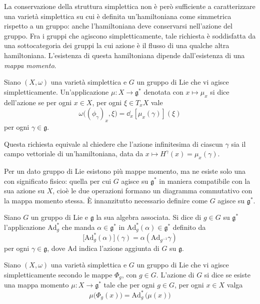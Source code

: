 La conservazione della struttura simplettica non è però sufficiente a caratterizzare una varietà simplettica su cui è definita un'hamiltoniana come simmetrica rispetto a un gruppo: anche l'hamiltoniana deve conservarsi nell'azione del gruppo. Fra i gruppi che agiscono simpletticamente, tale richiesta è soddisfatta da una sottocategoria dei gruppi la cui azione è il flusso di una qualche altra hamiltoniana. L'esistenza di questa hamiltoniana dipende dall'esistenza di una \emph{mappa momento}.
\begin{definition}
  Siano $(X,\omega)$ una varietà simplettica e $G$ un gruppo di Lie che vi agisce simpletticamente. Un'applicazione $\mu: X\to \mathfrak{g}^*$ denotata con $x \mapsto \mu_x$ si dice  dell'azione se per ogni $x \in X$, per ogni $\xi \in T_x X$ vale
  \begin{equation*}
  \omega\big((\phi_{\gamma})_x, \xi\big) = \dd_x [\mu_x(\gamma)](\xi)
  \end{equation*} 
  per ogni $\gamma \in \mathfrak{g}$.
\end{definition}
\begin{remark}
  Questa richiesta equivale al chiedere che l'azione infinitesima di ciascun $\gamma$ sia il campo vettoriale di un'hamiltoniana, data da $x \mapsto H^{\gamma}(x) = \mu_x(\gamma)$.
\end{remark}

Per un dato gruppo di Lie esistono più mappe momento, ma ne esiste solo una con significato fisico: quella per cui $G$ agisce su $\mathfrak{g}^*$ in maniera compatibile con la sua azione su $X$, cioè le due operazioni formano un diagramma commutativo con la mappa momento stessa. È innanzitutto necessario definire come $G$ agisce su $\mathfrak{g}^*$.
\begin{definition}
  Siano $G$ un gruppo di Lie e $\mathfrak{g}$ la sua algebra associata. Si dice  di $g \in G$ su $\mathfrak{g}^*$ l'applicazione $\mathrm{Ad}_g^*$ che manda $\alpha \in \mathfrak{g}^*$ in $\mathrm{Ad}^*_g(\alpha) \in \mathfrak{g}^*$ definito da
  \begin{equation*}
  \big[\mathrm{Ad}^*_g(\alpha)\big](\gamma) = \alpha(\mathrm{Ad}_{g^{-1}}\gamma)
  \end{equation*}
  per ogni $\gamma \in \mathfrak{g}$, dove $\mathrm{Ad}$ indica l'azione aggiunta di $G$ su $\mathfrak{g}$.
\end{definition}
\begin{definition}
  Siano $(X, \omega)$ una varietà simplettica e $G$ un gruppo di Lie che vi agisce simpletticamente secondo le mappe $\Phi_g$, con $g \in G$. L'azione di $G$ si dice  se esiste una mappa momento $\mu: X \to \mathfrak{g}^*$ tale che per ogni $g \in G$, per ogni $x \in X$ valga
  \begin{equation*}
  \mu\big(\Phi_g(x)\big) = \mathrm{Ad}_g^*\, \big(\mu(x)\big)
  \end{equation*} 
\end{definition}

